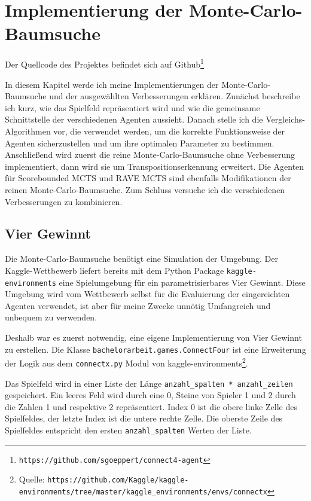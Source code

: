 \section{Implementierung der Monte-Carlo-Baumsuche}
\label{chap:mcts-impl}

Der Quellcode des Projektes befindet sich auf Github\footnote{\texttt{https://github.com/sgoeppert/connect4-agent}}

\bigskip
In diesem Kapitel werde ich meine Implementierungen der Monte-Carlo-Baumsuche und der ausgewählten Verbesserungen erklären.
Zunächst beschreibe ich kurz, wie das Spielfeld repräsentiert wird und wie die gemeinsame Schnittstelle der verschiedenen Agenten aussieht.
Danach stelle ich die Vergleichs-Algorithmen vor, die verwendet werden, um die korrekte Funktionsweise der Agenten sicherzustellen und um ihre optimalen Parameter zu bestimmen.
Anschließend wird zuerst die reine Monte-Carlo-Baumsuche ohne Verbesserung implementiert, dann wird sie um Transpositionserkennung erweitert.
Die Agenten für Scorebounded MCTS und RAVE MCTS sind ebenfalls Modifikationen der reinen Monte-Carlo-Baumsuche.
Zum Schluss versuche ich die verschiedenen Verbesserungen zu kombinieren.

\subsection{Vier Gewinnt}
\label{chap:viergewinnt-impl}
Die Monte-Carlo-Baumsuche benötigt eine Simulation der Umgebung.
Der Kaggle-Wettbewerb liefert bereits mit dem Python Package \verb|kaggle-environments| eine Spielumgebung für ein parametrisierbares Vier Gewinnt.
Diese Umgebung wird vom Wettbewerb selbst für die Evaluierung der eingereichten Agenten verwendet, ist aber für meine Zwecke unnötig Umfangreich und unbequem zu verwenden.

Deshalb war es zuerst notwendig, eine eigene Implementierung von Vier Gewinnt zu erstellen.
Die Klasse \verb|bachelorarbeit.games.ConnectFour| ist eine Erweiterung der Logik aus dem \verb|connectx.py| Modul von kaggle-environments\footnote{Quelle: \texttt{https://github.com/Kaggle/kaggle-environments/tree/master/kaggle\_environments/envs/connectx}}.

Das Spielfeld wird in einer Liste der Länge \verb|anzahl_spalten * anzahl_zeilen| gespeichert.
Ein leeres Feld wird durch eine 0, Steine von Spieler 1 und 2 durch die Zahlen 1 und respektive 2 repräsentiert.
Index 0 ist  die obere linke Zelle des Spielfeldes, der letzte Index ist die untere rechte Zelle.
Die oberste Zeile des Spielfeldes entspricht den ersten \verb|anzahl_spalten| Werten der Liste.


